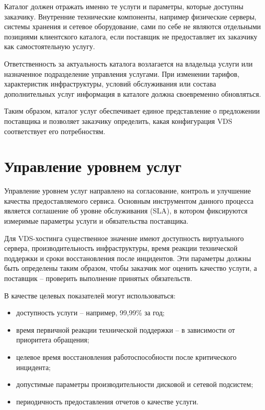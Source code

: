 \documentclass[14pt,a4paper]{extarticle}
\begin{document}
Каталог должен отражать именно те услуги и параметры, которые доступны заказчику.
Внутренние технические компоненты, например физические серверы, системы хранения
и сетевое оборудование, сами по себе не являются отдельными позициями клиентского
каталога, если поставщик не предоставляет их заказчику как самостоятельную услугу.

Ответственность за актуальность каталога возлагается на владельца услуги или
назначенное подразделение управления услугами. При изменении тарифов,
характеристик инфраструктуры, условий обслуживания или состава дополнительных
услуг информация в каталоге должна своевременно обновляться.

Таким образом, каталог услуг обеспечивает единое представление о предложении
поставщика и позволяет заказчику определить, какая конфигурация VDS соответствует
его потребностям.

\section{Управление уровнем услуг}

Управление уровнем услуг направлено на согласование, контроль и улучшение качества
предоставляемого сервиса. Основным инструментом данного процесса является
соглашение об уровне обслуживания (SLA), в котором фиксируются измеримые
параметры услуги и обязательства поставщика.

Для VDS-хостинга существенное значение имеют доступность виртуального сервера,
производительность инфраструктуры, время реакции технической поддержки и сроки
восстановления после инцидентов. Эти параметры должны быть определены таким
образом, чтобы заказчик мог оценить качество услуги, а поставщик -- проверить
выполнение принятых обязательств.

В качестве целевых показателей могут использоваться:
\begin{itemize}
    \item доступность услуги -- например, 99,99\% за год;
    \item время первичной реакции технической поддержки -- в зависимости от
    приоритета обращения;
    \item целевое время восстановления работоспособности после критического
    инцидента;
    \item допустимые параметры производительности дисковой и сетевой подсистем;
    \item периодичность предоставления отчетов о качестве услуги.
\end{itemize}
\end{document}
